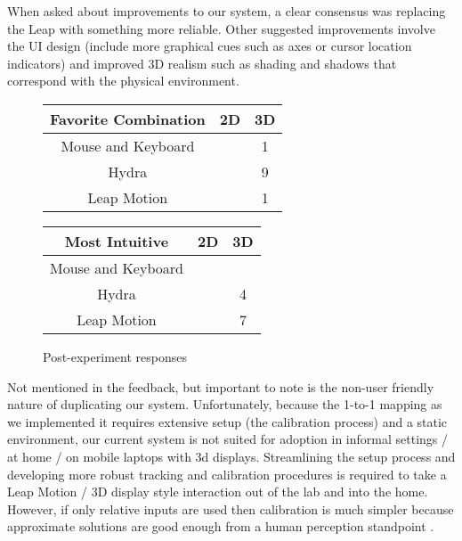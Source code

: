 When asked about improvements to our system, a clear consensus was replacing
the Leap with something more reliable.  Other suggested improvements involve
the UI design (include more graphical cues such as axes or cursor location
indicators) and improved 3D realism such as shading and shadows that
correspond with the physical environment.

\begin{figure}
    \centering
    \begin{tabular}{c | c | c}
    Favorite Combination & 2D & 3D \\ \hline
    Mouse and Keyboard   &    & 1 \\
    Hydra                &    & 9 \\
    Leap Motion          &    & 1 \\
    \end{tabular}

    \vspace{0.2in}

    \begin{tabular}{c | c | c}
    Most Intuitive     & 2D & 3D \\ \hline
    Mouse and Keyboard &    &  \\
    Hydra              &    & 4 \\
    Leap Motion        &    & 7 \\
    \end{tabular}

    \caption{Post-experiment responses}
    \label{fig:post}
\end{figure}

Not mentioned in the feedback, but important to note is the non-user friendly
nature of duplicating our system.  Unfortunately, because the 1-to-1 mapping
as we implemented it requires extensive setup (the calibration process) and a
static environment, our current system is not suited for adoption in informal
settings / at home / on mobile laptops with 3d displays.  Streamlining the
setup process and developing more robust tracking and calibration procedures
is required to take a Leap Motion / 3D display style interaction out of the
lab and into the home.  However, if only relative inputs are used then
calibration is much simpler because approximate solutions are good enough from
a human perception standpoint \cite{leewii}.
